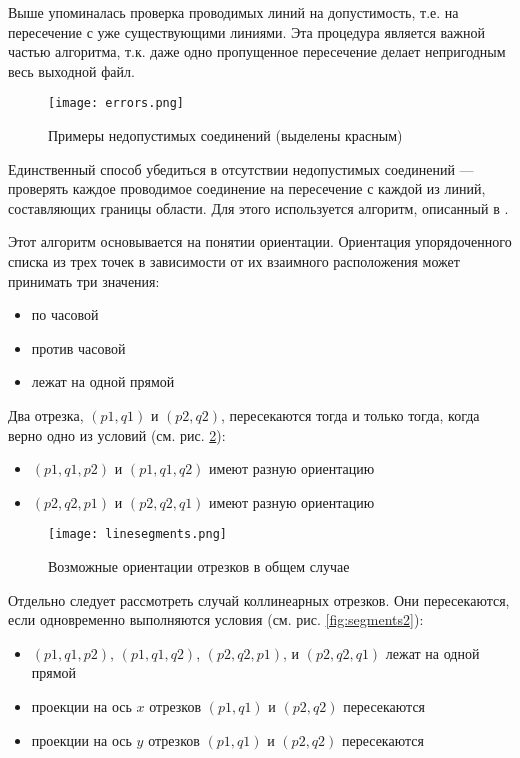 Выше упоминалась проверка проводимых линий на допустимость, т.е. на пересечение с уже существующими линиями. Эта процедура является важной частью алгоритма, т.к. даже одно пропущенное пересечение делает непригодным весь выходной файл.

\begin{figure}[!htb]
    \centering
    \texttt{[image: errors.png]}
    \caption{Примеры недопустимых соединений (выделены красным)}
    \label{fig:errors}
\end{figure}

Единственный способ убедиться в отсутствии недопустимых соединений --- проверять каждое проводимое соединение на пересечение с каждой из линий, составляющих границы области. Для этого используется алгоритм, описанный в \cite{noauthor_introduction_2009}.

Этот алгоритм основывается на понятии ориентации. Ориентация упорядоченного списка из трех точек в зависимости от их взаимного расположения может принимать три значения:

\begin{itemize}[noitemsep]
\item по часовой
\item против часовой
\item лежат на одной прямой
\end{itemize}

Два отрезка, $(p1,q1)$ и $(p2,q2)$, пересекаются тогда и только тогда, когда верно одно из условий (см. рис. \ref{fig:segments1}):

\begin{itemize}[noitemsep]
\item $(p1, q1, p2)$ и $(p1, q1, q2)$ имеют разную ориентацию
\item $(p2, q2, p1)$ и $(p2, q2, q1)$ имеют разную ориентацию
\end{itemize}

\begin{figure}[!h]
    \centering
    \texttt{[image: linesegments.png]}
    \caption{Возможные ориентации отрезков в общем случае}
    \label{fig:segments1}
\end{figure}

Отдельно следует рассмотреть случай коллинеарных отрезков. Они пересекаются, если одновременно выполняются условия (см. рис. \ref{fig:segments2}):

\begin{itemize}[noitemsep]
\item $(p1, q1, p2)$, $(p1, q1, q2)$, $(p2, q2, p1)$, и $(p2, q2, q1)$ лежат на одной прямой
\item проекции на ось $x$ отрезков $(p1, q1)$ и $(p2, q2)$ пересекаются
\item проекции на ось $y$ отрезков $(p1, q1)$ и $(p2, q2)$ пересекаются
\end{itemize}

